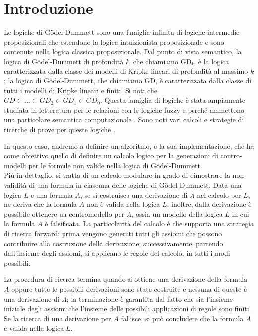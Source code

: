 \documentclass[\main/tesi.tex]{subfiles}
\begin{document}
\chapter{Introduzione}

Le logiche di G\"odel-Dummett sono una famiglia infinita di logiche
intermedie proposizionali che estendono la logica intuizionista
proposizionale
e sono contenute nella logica classica proposizionale.
Dal punto di vista semantico, la logica di  G\"odel-Dummett di profondit\`a
$k$,
che chiamiamo $\mathrm{GD}_k$,
\`e la logica caratterizzata dalla classe dei modelli di Kripke lineari
di profondit\`a
al massimo $k$; la logica di  G\"odel-Dummett,  che chiamiamo $\mathrm{GD}$,
\`e caratterizzata dalla classe di tutti i  modelli di Kripke lineari e finiti.
Si noti che $GD \subset \dots \subset GD_2 \subset GD_1 \subset GD_0$.
Questa famiglia di logiche \`e stata ampiamente studiata in letteratura
per le relazioni con le logiche
fuzzy \cite{Hajek:98} e perch\'e ammettono una particolare semantica computazionale
\cite{AscCiaGen:2017,Avron:91b}.
Sono noti vari calcoli e strategie di ricerche di prove per queste logiche \cite{Aschieri:2016,Avron:91b,BecPre:2018,FioFer:2020,Fiorino:2014,LarcheyWendling:2005}.

In questo caso, andremo a definire un algoritmo, e la sua implementazione, che ha come obiettivo quello di definire un calcolo logico per la generazioni di contro-modelli per le formule non valide nella logica di G\"odel-Dummett.\\
Pi\`u in dettaglio,
si tratta di un calcolo modulare in grado di dimostrare
la non-validit\`a di una formula in ciascuna delle logiche di
G\"odel-Dummett.
Data una logica $L$ e una formula $A$, se si costruisca una derivazione
di $A$ nel calcolo per $L$,
ne deriva che la formula $A$ non \`e valida nella logica $L$;
inoltre, dalla derivazione \`e possibile ottenere un contromodello per
$A$, ossia un modello
della logica $L$ in cui la formula $A$ \`e falsificata.
La particolarit\`a del calcolo \`e che supporta una strategia di ricerca
forward: prima vengono
generati tutti gli assiomi che possono contribuire alla costruzione
della derivazione;
successivamente, partendo dall'insieme degli assiomi, si applicano le
regole del calcolo, in tutti i modi possibili.

La procedura di ricerca termina quando si ottiene una derivazione della
formula $A$ oppure tutte le possibili derivazioni sono state costruite
e nessuna di queste \`e una derivazione di $A$; la terminazione \`e
garantita
dal fatto che sia l'insieme iniziale degli assiomi che l'insieme delle
possibili applicazioni di regole sono finiti.
Se la ricerca di una derivazione per $A$ fallisce,
si pu\`o concludere che la formula $A$ \`e valida nella logica $L$.
\end{document}
